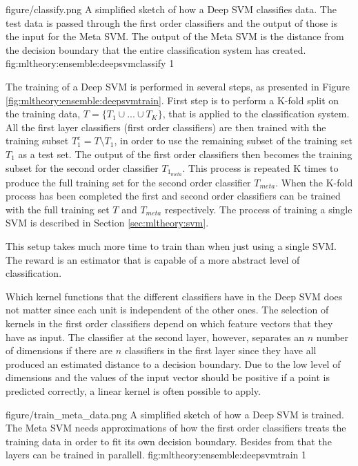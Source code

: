\singlefigure
{figure/classify.png}
{A simplified sketch of how a Deep SVM classifies data. The test data is passed through the first order classifiers and the output of those is the input for the Meta SVM. The output of the Meta SVM is the distance from the decision boundary that the entire classification system has created.}
{fig:mltheory:ensemble:deepsvmclassify}
{1}

The training of a Deep SVM is performed in several steps, as presented in Figure \ref{fig:mltheory:ensemble:deepsvmtrain}. First step is to perform a K-fold split on the training data, $T=\{T_1\cup...\cup T_K\}$, that is applied to the classification system. All the first layer classifiers (first order classifiers) are then trained with the training subset $T_1^c=T\setminus T_1$, in order to use the remaining subset of the training set $T_1$ as a test set. The output of the first order classifiers then becomes the training subset for the second order classifier $T_{1_{meta}}$. This process is repeated K times to produce the full training set for the second order classifier $T_{meta}$. When the K-fold process has been completed the first and second order classifiers can be trained with the full training set $T$ and $T_{meta}$ respectively. The process of training a single SVM is described in Section \ref{sec:mltheory:svm}.  

This setup takes much more time to train than when just using a single SVM. The reward is an estimator that is capable of a more abstract level of classification.

Which kernel functions that the different classifiers have in the Deep SVM does not matter since each unit is independent of the other ones. The selection of kernels in the first order classifiers depend on which feature vectors that they have as input. The classifier at the second layer, however, separates an $n$ number of dimensions if there are $n$ classifiers in the first layer since they have all produced an estimated distance to a decision boundary. Due to the low level of dimensions and the values of the input vector should be positive if a point is predicted correctly, a linear kernel is often possible to apply.

\singlefigure
{figure/train_meta_data.png}
{A simplified sketch of how a Deep SVM is trained. The Meta SVM needs approximations of how the first order classifiers treats the training data in order to fit its own decision boundary. Besides from that the layers can be trained in parallell.}
{fig:mltheory:ensemble:deepsvmtrain}
{1}
